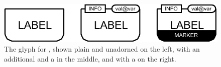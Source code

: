 \begin{figure}[H]
  \centering
  \includegraphics{images/genetic-combined}%
  \caption{The \PD glyph for , shown plain and unadorned on the left, with an additional  and a  in the middle, and with a  on the right.}
  \label{fig:genetic}
\end{figure}


